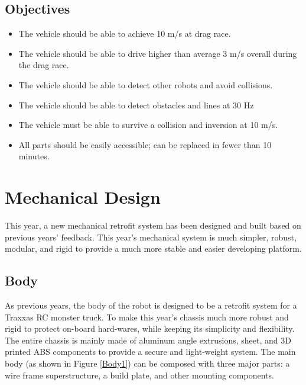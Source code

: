 \documentclass[11pt,journal]{IEEEtran}
\begin{document}
\subsection{Objectives}
\begin{itemize}
    \item The vehicle should be able to achieve 10 m/s at drag race.
    \item The vehicle should be able to drive higher than average 3 m/s overall during the drag race.
    \item The vehicle should be able to detect other robots and avoid collisions.
    \item The vehicle should be able to detect obstacles and lines at 30 Hz
    \item The vehicle must be able to survive a collision and inversion at 10 m/s.
    \item All parts should be easily accessible; can be replaced in fewer than 10 minutes.
\end{itemize}
\section{Mechanical Design}
 This year, a new mechanical retrofit system has been designed and built based on previous years' feedback. This year's mechanical system is much simpler, robust, modular, and rigid to provide a much more stable and easier developing platform.

\subsection{Body}
 As previous years, the body of the robot is designed to be a retrofit system for a Traxxas RC monster truck. To make this year's chassis much more robust and rigid to protect on-board hard-wares, while keeping its simplicity and flexibility. The entire chassis is mainly made of aluminum angle extrusions, sheet, and 3D printed ABS components to provide a secure and light-weight system. The main body (as shown in Figure \ref{Body1}) can be composed with three major parts: a wire frame superstructure, a build plate, and other mounting components.   
\end{document}
